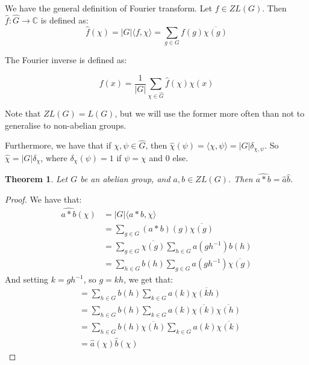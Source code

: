 \documentclass[]{article}
\newtheorem{theorem}{Theorem}
\theoremstyle{definition}
\numberwithin{theorem}{section}
\numberwithin{equation}{section}
\begin{document}
We have the general definition of Fourier transform. Let $f \in ZL(G)$. Then $\widehat{f}: \widehat{G} \rightarrow \mathbb{C}$ is defined as:
\begin{equation}
	\widehat{f}(\chi) = |G| \langle f, \chi \rangle = \sum_{g \in G} f(g) \overline{\chi(g)}
\end{equation}

The Fourier inverse is defined as:

\begin{equation}
	f(x) = \frac{1}{|G|} \sum_{\chi \in \widehat{G}} \widehat{f}(\chi) \chi(x)
\end{equation}

Note that $ZL(G) = L(G)$, but we will use the former more often than not to generalise to non-abelian groups.

Furthermore, we have that if $\chi, \psi \in \widehat{G}$, then $\widehat{\chi}(\psi) = \langle \chi, \psi \rangle = |G|\delta_{\chi, \psi}$. So $\widehat{\chi} = |G| \delta_{\chi}$, where $\delta_{\chi}(\psi) = 1$ if $\psi = \chi$ and 0 else. 

\begin{theorem}
	\label{thm:abelian dual commutation}
	Let $G$ be an abelian group, and $a, b \in ZL(G)$. Then $ \widehat{a \ast b} = \widehat{a} \widehat{b}$. 
\end{theorem}

\begin{proof}
	We have that:
\begin{align*}
		\widehat{a \ast b}(\chi) &= |G| \langle a \ast b, \chi \rangle\\
		&= \sum_{g \in G} (a \ast b) (g) \overline{\chi(g)} \\
		&= \sum_{g \in G} \overline{\chi(g)} 
		\sum_{h \in G} a(g h^{-1}) b(h) \\
		&= \sum_{h \in G} b(h)  
		\sum_{g \in G} a(g h^{-1})\overline{\chi(g)}  
\end{align*} 
And setting $k = gh^{-1}$, so $g =kh$, we get that:
\begin{align*}
		&= \sum_{h \in G} b(h)  
		\sum_{k \in G} a(k)\overline{\chi(kh)} \\
		&= \sum_{h \in G} b(h)  
		\sum_{k \in G} a(k)\overline{\chi(k)} \overline{\chi(h)} \\
		&=  \sum_{h \in G} b(h)  \overline{\chi(h)} 
		\sum_{k \in G} a(k)\overline{\chi(k)}\\
		&= \widehat{a}(\chi) \widehat{b}(\chi)
\end{align*}
\end{proof}
\end{document}
